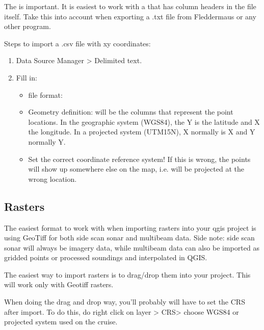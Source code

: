 \documentclass[letterpaper,10pt,english]{sphinxmanual}
\begin{document}
\sphinxAtStartPar
The   is important. It is easiest to work with a  that has column headers in the file itself. Take this into account when exporting a .txt file from Fleddermaus or any other program.

\sphinxAtStartPar
Steps to import a .csv file with xy coordinates:
\begin{enumerate}
%
\item {} 
\sphinxAtStartPar
Data Source Manager \sphinxhyphen{}\textgreater{} Delimited text.

\item {} 
\sphinxAtStartPar
Fill in:
\begin{itemize}
\item {} 
\sphinxAtStartPar
file format:

\item {} 
\sphinxAtStartPar
Geometry definition: will be the columns that represent the point locations. In the geographic system (WGS84), the Y is the latitude and X the longitude. In a projected system (UTM15N), X normally is X and Y normally Y.

\item {} 
\sphinxAtStartPar
Set the correct coordinate reference system! If this is wrong, the points will show up somewhere else on the map, i.e. will be projected at the wrong location.

\end{itemize}

\end{enumerate}


\subsection{Rasters}
\label{\detokenize{03_data_ingest:rasters}}
\sphinxAtStartPar
The easiest format to work with when importing rasters into your qgis project is using GeoTiff for both side scan sonar and multibeam data. Side note: side scan sonar will always be imagery data, while multibeam data can also be imported as gridded points or processed soundings and interpolated in QGIS.

\sphinxAtStartPar
The easiest way to import rasters is to drag/drop them into your project. This will work only with Geotiff rasters.

\sphinxAtStartPar
When doing the drag and drop way, you’ll probably will have to set the CRS after import. To do this, do right click on layer \sphinxhyphen{}\textgreater{} CRS\sphinxhyphen{}\textgreater{} choose WGS84 or projected system used on the cruise.
\end{document}
